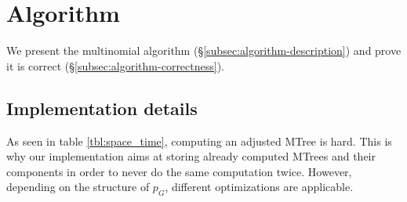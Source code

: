 \section{Algorithm}\label{sec:algorithms}
We present the multinomial \algoFAIR algorithm (\S\ref{subsec:algorithm-description}) and prove it is correct (\S\ref{subsec:algorithm-correctness}).

\subsection{Implementation details}\label{subsec:implementation-details}
As seen in table \ref{tbl:space_time}, computing an adjusted MTree is hard. This is why our implementation aims at storing already computed MTrees and their components in order to never do the same computation twice. However, depending on the structure of $p_G$, different optimizations are applicable.
